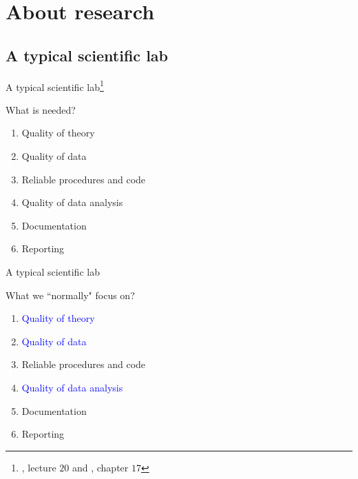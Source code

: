 \section{About research}
%
%
\subsection{A typical scientific lab}
%
%
\begin{frame}[t, negative]
	\subsectionpage
\end{frame}
%
%
\begin{lhframe}[rhgraphic={\texttt{[image: lab1.jpg]}}]
	{A typical scientific lab\footnote{\citet{McElreath_2020}, lecture $20$ and \citet{McElreath_2022}, chapter $17$ \nocite{McElreath_2019} \nocite{Hernan_et_al_2020} \nocite{Cunningham_2022} } }
	
	What is needed? \\
	
	\begin{enumerate}
		\item Quality of theory
		\item Quality of data
		\item Reliable procedures and code
		\item Quality of data analysis
		\item Documentation
		\item Reporting
	\end{enumerate} 
\end{lhframe}
%
%
\begin{lhframe}[rhgraphic={\texttt{[image: woman\_cat.jpg]}}]
	{A typical scientific lab}
	
	What we ``normally" focus on? \\
	
	\begin{enumerate}
		\item \textcolor{blue}{Quality of theory}
		\item \textcolor{blue}{Quality of data}
		\item Reliable procedures and code
		\item \textcolor{blue}{Quality of data analysis}
		\item Documentation
		\item Reporting
	\end{enumerate}
\end{lhframe}
